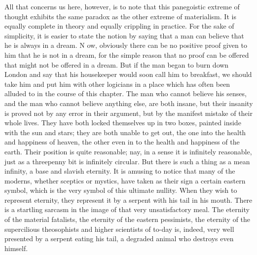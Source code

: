 \documentclass{book}
\begin{document}
All that concerns us here, however, is to note that this panegoistic extreme of thought exhibits the same paradox as the other extreme of materialism. It is equally complete in theory and equally crippling in practice. For the sake of simplicity, it is easier to state the notion by saying that a man can believe that he is always in a dream. N ow, obviously there can be no positive proof given to him that he is not in a dream, for the simple reason that no proof can be offered that might not be offered in a dream. But if the man began to burn down London and say that his housekeeper would soon call him to breakfast, we should take him and put him with other logicians in a place which has often been alluded to in the course of this chapter. The man who cannot believe his senses, and the man who cannot believe anything else, are both insane, but their insanity is proved not by any error in their argument, but by the manifest mistake of their whole lives. They have both locked themselves up in two boxes, painted inside with the sun and stars; they are both unable to get out, the one into the health and happiness of heaven, the other even in to the health and happiness of the earth. Their position is quite reasonable; nay, in a sense it is infinitely reasonable, just as a threepenny bit is infinitely circular. But there is such a thing as a mean infinity, a base and slavish eternity. It is amusing to notice that many of the moderns, whether sceptics or mystics, have taken as their sign a certain eastern symbol, which is the very symbol of this ultimate nullity. When they wish to represent eternity, they represent it by a serpent with his tail in his mouth. There is a startling sarcasm in the image of that very unsatisfactory meal. The eternity of the material fatalists, the eternity of the eastern pessimists, the eternity of the supercilious theosophists and higher scientists of to-day is, indeed, very well presented by a serpent eating his tail, a degraded animal who destroys even himself.
\end{document}
